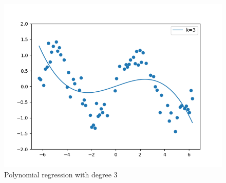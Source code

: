 \begin{answer}
\begin{figure}[H]
  \centering
  \vspace{-2mm}
  \includegraphics[width=0.65\linewidth]{../src/featuremaps/large-poly3.png}
  \centering
\caption{Polynomial regression with degree 3}
\end{figure}

\end{answer}
